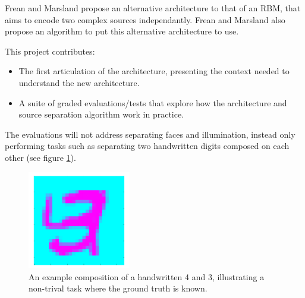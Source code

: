 Frean and Marsland propose an alternative architecture to that of an RBM, that aims to encode two complex sources independantly. Frean and Marsland also propose an algorithm to put this alternative architecture to use.

This project contributes:
\begin{itemize}
  \item The first articulation of the architecture, presenting the context needed to understand the new architecture.
  \item A suite of graded evaluations/tests that explore how the architecture and source separation algorithm work in practice.
\end{itemize}
The evaluations will not address separating faces and illumination, instead only performing tasks such as separating two handwritten digits composed on each other (see figure \ref{F:Composition-Example}).




\begin{figure}[h]
\begin{center}
  \includegraphics[width = 0.4\textwidth]{Assets/composition-example.png}
\caption{An example composition of a handwritten 4 and 3, illustrating a non-trival task where the ground truth is known.}
\label{F:Composition-Example}
\end{center}
\end{figure}


